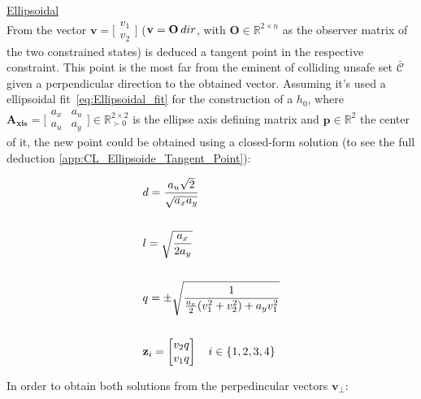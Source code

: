 \underline{Ellipsoidal}
\label{sssec:Constraint_Tangent_Point_Ellipsoidal} \\

From the vector \(\mathbf{v} = \bigl[\begin{smallmatrix} v_1\\ v_2 \end{smallmatrix} \bigr]\) (\(\mathbf{v} = \mathbf{O} \hspace{0.2em} dir\), with \(\mathbf{O} \in \mathbb{R}^{2 \times n}\) as the observer matrix of the two constrained states) is deduced a tangent point in the respective constraint. This point is the most far from the eminent of colliding unsafe set \(\bar{\mathcal{C}}\) given a perpendicular direction to the obtained vector.%
Assuming it's used a ellipsoidal fit~\ref{eq:Ellipsoidal_fit} for the construction of a  \(h_0\), where \(\mathbf{A_{xis}} = \bigl[\begin{smallmatrix} a_x&a_u \\ a_u&a_y \end{smallmatrix} \bigr] \in \mathbb{R}^{2 \times 2}_{\succ 0}\) is the ellipse axis defining matrix and \(\mathbf{p} \in \mathbb{R}^{2}\) the center of it, the new point could be obtained using a closed-form solution (to see the full deduction \ref{app:CL_Ellipsoide_Tangent_Point}):


\begin{align}
    &d = \frac{a_u\sqrt{2}}{\sqrt{a_xa_y}} \label{eq:Constraint_Tangent_Point_auxElement1} \\
    \notag \\
    &l = \sqrt{\frac{a_x}{2a_y}} \label{eq:Constraint_Tangent_Point_auxElement2} \\
    \notag \\
    &q = \pm\sqrt{\frac{1}{\frac{a_x}{2}(v_1^2 + v_2^2) + a_yv_1^2}}  \label{eq:Constraint_Tangent_Point_auxAuxElement} \\
    \notag \\
    &\mathbf{z}_i = \begin{bmatrix}  v_2 q \\ v_1 q \end{bmatrix} \quad i \in \{1,2,3,4\} \label{eq:Constraint_Tangent_Point_auxVector} 
\end{align}

In order to obtain both solutions from the perpedincular vectors \(\mathbf{v}_{\perp}\):

